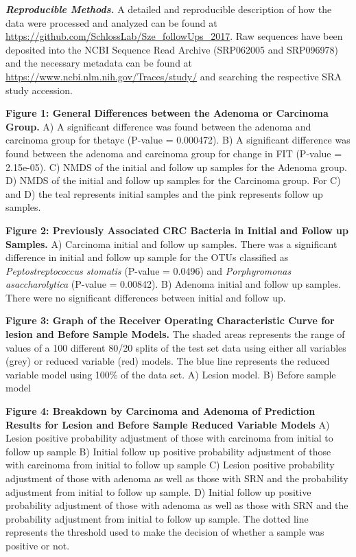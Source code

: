 \documentclass[12pt,]{article}
\begin{document}
\textbf{\emph{Reproducible Methods.}} A detailed and reproducible
description of how the data were processed and analyzed can be found at
\url{https://github.com/SchlossLab/Sze_followUps_2017}. Raw sequences
have been deposited into the NCBI Sequence Read Archive (SRP062005 and
SRP096978) and the necessary metadata can be found at
\url{https://www.ncbi.nlm.nih.gov/Traces/study/} and searching the
respective SRA study accession.

\newpage

\textbf{Figure 1: General Differences between the Adenoma or Carcinoma
Group.} A) A significant difference was found between the adenoma and
carcinoma group for thetayc (P-value = 0.000472). B) A significant
difference was found between the adenoma and carcinoma group for change
in FIT (P-value = 2.15e-05). C) NMDS of the initial and follow up
samples for the Adenoma group. D) NMDS of the initial and follow up
samples for the Carcinoma group. For C) and D) the teal represents
initial samples and the pink represents follow up samples.

\textbf{Figure 2: Previously Associated CRC Bacteria in Initial and
Follow up Samples.} A) Carcinoma initial and follow up samples. There
was a significant difference in initial and follow up sample for the
OTUs classified as \emph{Peptostreptococcus stomatis} (P-value = 0.0496)
and \emph{Porphyromonas asaccharolytica} (P-value = 0.00842). B) Adenoma
initial and follow up samples. There were no significant differences
between initial and follow up.

\textbf{Figure 3: Graph of the Receiver Operating Characteristic Curve
for lesion and Before Sample Models.} The shaded areas represents the
range of values of a 100 different 80/20 splits of the test set data
using either all variables (grey) or reduced variable (red) models. The
blue line represents the reduced variable model using 100\% of the data
set. A) Lesion model. B) Before sample model

\textbf{Figure 4: Breakdown by Carcinoma and Adenoma of Prediction
Results for Lesion and Before Sample Reduced Variable Models} A) Lesion
positive probability adjustment of those with carcinoma from initial to
follow up sample B) Initial follow up positive probability adjustment of
those with carcinoma from initial to follow up sample C) Lesion positive
probability adjustment of those with adenoma as well as those with SRN
and the probability adjustment from initial to follow up sample. D)
Initial follow up positive probability adjustment of those with adenoma
as well as those with SRN and the probability adjustment from initial to
follow up sample. The dotted line represents the threshold used to make
the decision of whether a sample was positive or not.
\end{document}
